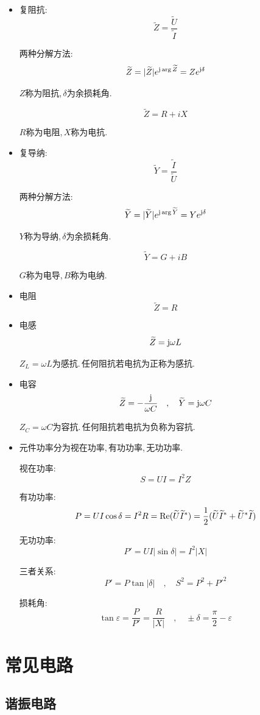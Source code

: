 \begin{itemize}
\item 复阻抗:
\[\tilde{Z}=\frac{\tilde{U}}{\tilde{I}}\]

两种分解方法:
\[\tilde{Z}=|\tilde{Z}|e^{\uj \arg{\tilde{Z}}}=Ze^{\uj \delta}\]

$Z$称为阻抗,\,$\delta$为余损耗角.

\[\tilde{Z}=R+iX\]

$R$称为电阻,\,$X$称为电抗.

\item 复导纳:
\[\tilde{Y}=\frac{\tilde{I}}{\tilde{U}}\]

两种分解方法:
\[\tilde{Y}=|\tilde{Y}|e^{\uj \arg{\tilde{Y}}}=Ye^{\uj \delta}\]

$Y$称为导纳,\,$\delta$为余损耗角.

\[\tilde{Y}=G+iB\]

$G$称为电导,\,$B$称为电纳.

\item 电阻
\[\tilde{Z}=R\]

\item 电感
\[\tilde{Z}=\uj \omega L\]

$Z_L=\omega L$为感抗.\,任何阻抗若电抗为正称为感抗.

\item 电容
\[\tilde{Z}=- \frac{\uj}{\omega C} \quad ,\quad \tilde{Y}=\uj \omega C\]

$Z_C=\omega C$为容抗.\,任何阻抗若电抗为负称为容抗.

\item 元件功率分为视在功率,\,有功功率,\,无功功率.

视在功率:
\[S=UI=I^2Z\]

有功功率:
\[P=UI\cos\delta=I^2R={\rm Re}(\tilde{U}\tilde{I}^*)=\frac{1}{2}(\tilde{U}\tilde{I}^*+\tilde{U}^*\tilde{I})\]

无功功率:
\[P'=UI|\sin\delta|=I^2 |X|\]

三者关系:
\[P'=P\tan|\delta|\quad ,\quad S^2=P^2+P'^2\]

损耗角:
\[\tan\varepsilon=\frac{P}{P'}=\frac{R}{|X|}\quad ,\quad \pm\delta=\frac{\pi}{2}-\varepsilon\]


\end{itemize}

\section{常见电路}

\subsection{谐振电路}

